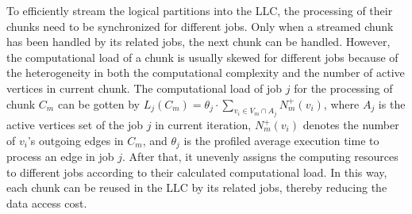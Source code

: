 \documentclass[10pt,journal,compsoc]{IEEEtran}
\begin{document}
To efficiently stream the logical partitions into the LLC, the processing of their chunks need to be synchronized for different jobs. Only when a streamed chunk has been handled by its related jobs, the next chunk can be handled.
However, the computational load of a chunk is usually skewed for different jobs because of the heterogeneity in both the computational complexity and the number of active vertices in current chunk. The computational load of job $j$ for the processing of chunk $C_m$ can be gotten by $L_j(C_m) = \theta_j \cdot \sum_{v_i \in V_m \cap A_j}{N_m^+(v_i)}$, where $A_j$ is the active vertices set of the job $j$ in current iteration, $N_m^+(v_i)$ denotes the number of $v_i$'s outgoing edges in $C_m$, and $\theta_j$ is the profiled average execution time to process an edge in job $j$.
After that, it unevenly assigns the computing resources  to different jobs according to their calculated computational load. In this way, each chunk can be reused in the LLC by its related jobs, thereby reducing the data access cost.

\vspace{-6pt}
\end{document}
